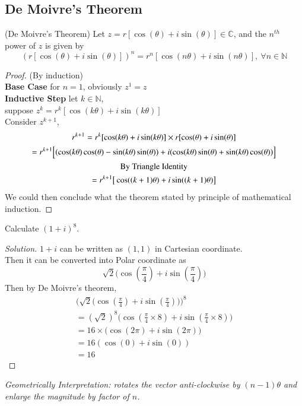 \documentclass[11pt]{article}
\begin{document}
		\subsection{De Moivre's Theorem}
		\begin{theorem}(De Moivre's Theorem)
			Let $z = r[\cos(\theta) + i \sin(\theta)] \in \mathbb{C}$, and the $n^{th}$ power of $z$ is given by
			\[
				(r[\cos(\theta) + i \sin(\theta)])^n = r^n [\cos(n\theta) + i \sin(n \theta)],\ \forall n \in \mathbb{N}
			\]
		\end{theorem}
		\begin{proof}
			(By induction) \\
			\textbf{Base Case} for $n=1$, obviously $z^1 = z$ \\
			\textbf{Inductive Step} let $k \in \mathbb{N}$, \\
			suppose $z^k = r^k [\cos(k \theta) + i \sin(k \theta)]$ \\
			Consider $z^{k+1}$, \\
			\begin{gather*}
				r^{k+1} = r^k [\cos(k \theta) + i \sin(k \theta)] \times r[\cos(\theta) + i \sin(\theta)] \\
				= r^{k+1} \Big[
					(\cos(k \theta) \cos(\theta) - \sin (k \theta) \sin(\theta)) + 
					i (\cos(k \theta) \sin(\theta) + \sin(k \theta) \cos(\theta))
				\Big] \\
				\text{{By Triangle Identity}} \\
				= r^{k+1} \big[ \cos((k+1)\theta) + i \sin((k+1) \theta) \big ]
			\end{gather*}
			We could then conclude what the theorem stated by principle of mathematical induction.
		\end{proof}
		
		\begin{example}
			Calculate $(1+i)^8$. 
			\begin{proof}[Solution]
				$1+i$ can be written as $(1,1)$ in Cartesian coordinate. \\
				Then it can be converted into Polar coordinate as 
				\[
					\sqrt{2} \Big ( \cos(\frac{\pi}{4}) + i \sin(\frac{\pi}{4})\Big)
				\]
				Then by De Moivre's theorem,
				\begin{gather*}
					\Big( \sqrt{2} \Big ( \cos(\frac{\pi}{4}) + i \sin(\frac{\pi}{4})\Big) \Big)^8 \\
					= (\sqrt{2})^8 \Big ( \cos(\frac{\pi}{4} \times 8) + i \sin(\frac{\pi}{4} \times 8)\Big) \\
					= 16 \times \Big ( \cos(2\pi) + i \sin(2\pi)\Big) \\
					= 16 (\cos(0) + i \sin(0)) \\
					= 16
				\end{gather*}
			\end{proof}
			\emph{Geometrically Interpretation: rotates the vector anti-clockwise by $(n-1)\theta$ and enlarge the magnitude by factor of $n$.}
		\end{example}
		
\end{document}
